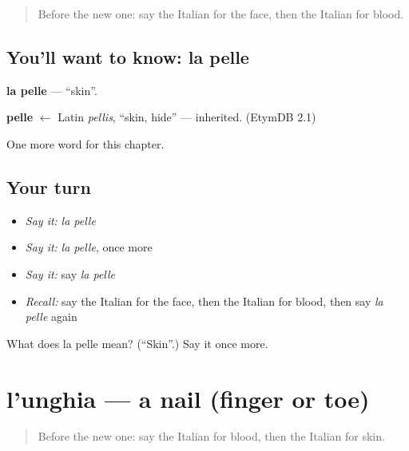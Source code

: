 \label{lesson:IT-C39-pelle}



\begin{quote}
Before the new one: say the Italian for the face, then the Italian for blood.
\end{quote}

\subsection*{You'll want to know: la pelle}
\textbf{la pelle} — \textquotedblleft{}skin\textquotedblright{}.

\begin{cousinweb}
\textbf{pelle} $\leftarrow$ Latin \emph{pellis}, \textquotedblleft{}skin, hide\textquotedblright{} — inherited. (EtymDB 2.1)
\end{cousinweb}

\begin{grammarlens}[title={What you've built}]
One more word for this chapter.
\end{grammarlens}

\subsection*{Your turn}
\begin{itemize}
\raggedright
  \item \emph{Say it:} \emph{la pelle}
  \item \emph{Say it:} \emph{la pelle}, once more
  \item \emph{Say it:} say \emph{la pelle}
  \item \emph{Recall:} say the Italian for the face, then the Italian for blood, then say \emph{la pelle} again
\end{itemize}

\begin{tcolorbox}[breakable,colback=teal!4,colframe=teal!35!black,title={Before you move on}]
What does la pelle mean? (\textquotedblleft{}Skin\textquotedblright{}.) Say it once more.
\end{tcolorbox}
\section[l'unghia]{l'unghia — a nail (finger or toe)}

\label{lesson:IT-C39-unghia}



\begin{quote}
Before the new one: say the Italian for blood, then the Italian for skin.
\end{quote}

